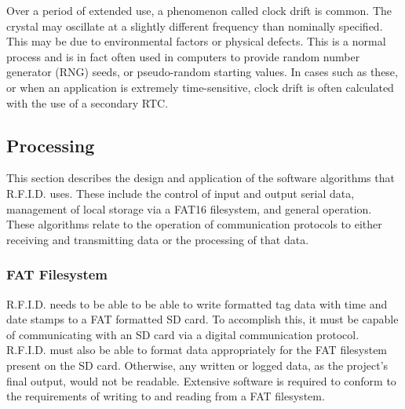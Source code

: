 Over a period of extended use, a phenomenon called clock drift is common. The crystal may oscillate at a slightly different frequency than nominally specified. This may be due to environmental factors or physical defects. This is a normal process and is in fact often used in computers to provide random number generator (RNG) seeds, or pseudo-random starting values. In cases such as these, or when an application is extremely time-sensitive, clock drift is often calculated with the use of a secondary RTC.

\subsection{Processing}
This section describes the design and application of the software algorithms that R.F.I.D. uses. These include the control of input and output serial data, management of local storage via a FAT16 filesystem, and general operation. These algorithms relate to the operation of communication protocols to either receiving and transmitting data or the processing of that data.


\label{sss:FAT}
\subsubsection{FAT Filesystem} %

R.F.I.D. needs to be able to be able to write formatted tag data with time and date stamps to a FAT formatted SD card. To accomplish this, it must be capable of communicating with an SD card via a digital communication protocol. R.F.I.D. must also be able to format data appropriately for the FAT filesystem present on the SD card. Otherwise, any written or logged data, as the project's final output, would not be readable. Extensive software is required to conform to the requirements of writing to and reading from a FAT filesystem. 



